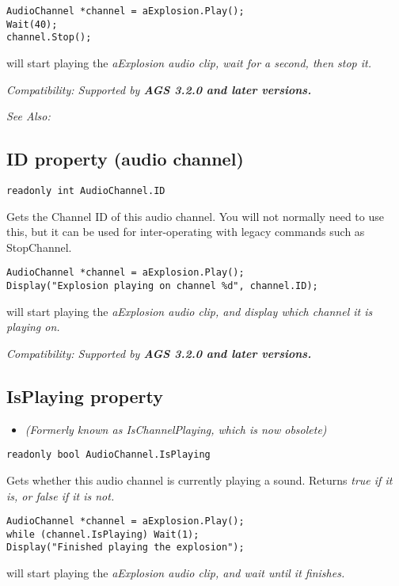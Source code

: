\begin{verbatim}
AudioChannel *channel = aExplosion.Play();
Wait(40);
channel.Stop();
\end{verbatim}
will start playing the \it{aExplosion} audio clip, wait for a second, then stop it.

\it{Compatibility:} Supported by \bf{AGS 3.2.0} and later versions.

\it{See Also:} 


\subsection{ID property (audio channel)}\label{AudioChannel.ID}%

\begin{verbatim}
readonly int AudioChannel.ID
\end{verbatim}
Gets the Channel ID of this audio channel. You will not normally need to use this,
but it can be used for inter-operating with legacy commands such as StopChannel.

\begin{verbatim}
AudioChannel *channel = aExplosion.Play();
Display("Explosion playing on channel %d", channel.ID);
\end{verbatim}
will start playing the \it{aExplosion} audio clip, and display which channel it is playing on.

\it{Compatibility:} Supported by \bf{AGS 3.2.0} and later versions.


\subsection{IsPlaying property}\label{AudioChannel.IsPlaying}%

\begin{itemize}
\item \it{(Formerly known as IsChannelPlaying, which is now obsolete)}
\end{itemize}

\begin{verbatim}
readonly bool AudioChannel.IsPlaying
\end{verbatim}
Gets whether this audio channel is currently playing a sound. Returns \it{true} if it is,
or \it{false} if it is not.

\begin{verbatim}
AudioChannel *channel = aExplosion.Play();
while (channel.IsPlaying) Wait(1);
Display("Finished playing the explosion");
\end{verbatim}
will start playing the \it{aExplosion} audio clip, and wait until it finishes.

